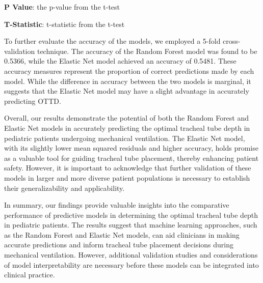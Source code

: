 \documentclass[11pt]{article}
\begin{document}
\begin{table}[h]
\caption{Comparison of predictive performance between Random Forest and Elastic Net Models}
\label{table:Table_1}
\begin{threeparttable}
\renewcommand{\TPTminimum}{\linewidth}
\begin{tablenotes}
\footnotesize
\item \textbf{P Value}: the p-value from the t-test
\item \textbf{T-Statistic}: t-statistic from the t-test
\end{tablenotes}
\end{threeparttable}
\end{table}


To further evaluate the accuracy of the models, we employed a 5-fold cross-validation technique. The accuracy of the Random Forest model was found to be 0.5366, while the Elastic Net model achieved an accuracy of 0.5481. These accuracy measures represent the proportion of correct predictions made by each model. While the difference in accuracy between the two models is marginal, it suggests that the Elastic Net model may have a slight advantage in accurately predicting OTTD.

Overall, our results demonstrate the potential of both the Random Forest and Elastic Net models in accurately predicting the optimal tracheal tube depth in pediatric patients undergoing mechanical ventilation. The Elastic Net model, with its slightly lower mean squared residuals and higher accuracy, holds promise as a valuable tool for guiding tracheal tube placement, thereby enhancing patient safety. However, it is important to acknowledge that further validation of these models in larger and more diverse patient populations is necessary to establish their generalizability and applicability.

In summary, our findings provide valuable insights into the comparative performance of predictive models in determining the optimal tracheal tube depth in pediatric patients. The results suggest that machine learning approaches, such as the Random Forest and Elastic Net models, can aid clinicians in making accurate predictions and inform tracheal tube placement decisions during mechanical ventilation. However, additional validation studies and considerations of model interpretability are necessary before these models can be integrated into clinical practice.
\end{document}

